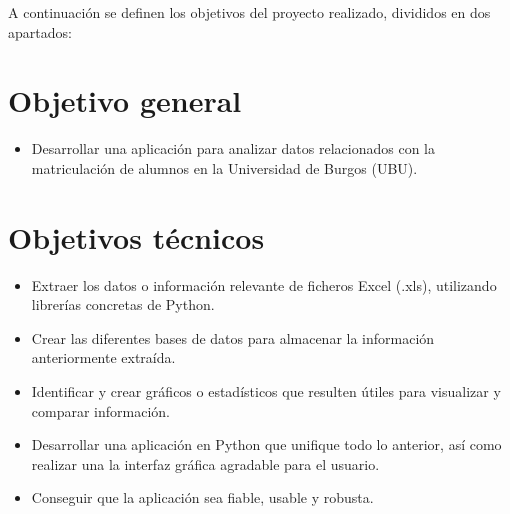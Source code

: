 
A continuación se definen los objetivos del proyecto realizado, divididos en dos apartados:


\section{Objetivo general}\label{objetivo-general}

\begin{itemize}

\item
  Desarrollar una aplicación para analizar datos relacionados con la matriculación de alumnos en la Universidad de Burgos (UBU).
  
\end{itemize}


\section{Objetivos técnicos}\label{objetivos-tecnicos}

\begin{itemize}

\item
  Extraer los datos o información relevante de ficheros Excel (.xls), utilizando librerías concretas de Python.
\item
  Crear las diferentes bases de datos para almacenar la información anteriormente extraída. 
\item
  Identificar y crear gráficos o estadísticos que resulten útiles para visualizar y comparar información.
\item
  Desarrollar una aplicación en Python que unifique todo lo anterior, así como realizar una la interfaz gráfica agradable para el usuario.
\item
  Conseguir que la aplicación sea fiable, usable y robusta.

\end{itemize} 


